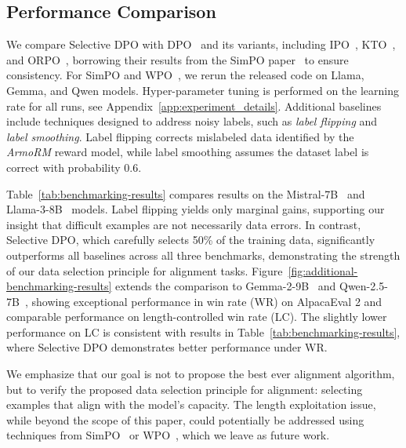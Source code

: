 \subsection{Performance Comparison}

 We compare Selective DPO with DPO~\cite{rafailov2024direct} and its variants, including IPO~\cite{Azar2023AGT}, KTO~\cite{Ethayarajh2024KTOMA}, and ORPO~\cite{Hong2024ORPOMP}, borrowing their results from the SimPO paper~\cite{meng2024simpo} to ensure consistency. For SimPO and WPO~\cite{zhou2024wpo}, we rerun the released code on Llama, Gemma, and Qwen models. Hyper-parameter tuning is performed on the learning rate for all runs, see Appendix~\ref{app:experiment_details}. 
Additional baselines include techniques designed to address noisy labels, such as \textit{label flipping} and \textit{label smoothing}. Label flipping corrects mislabeled data identified by the \textit{ArmoRM} reward model, while label smoothing assumes the dataset label is correct with probability 0.6. 


 Table~\ref{tab:benchmarking-results} compares results on the Mistral-7B~\cite{jiang2023mistral} and Llama-3-8B~\cite{llama3modelcard} models. Label flipping yields only marginal gains, supporting our insight that difficult examples are not necessarily data errors. In contrast, Selective DPO, which carefully selects 50\% of the training data, significantly outperforms all baselines across all three benchmarks, demonstrating the strength of our data selection principle for alignment tasks. 
Figure~\ref{fig:additional-benchmarking-results} extends the comparison to Gemma-2-9B~\cite{team2024gemma} and Qwen-2.5-7B~\cite{qwen2.5}, showing exceptional performance in win rate (WR) on AlpacaEval 2 and comparable performance on length-controlled win rate (LC). The slightly lower performance on LC is consistent with results in Table~\ref{tab:benchmarking-results}, where Selective DPO demonstrates better performance under WR. 

We emphasize that our goal is not to propose the best ever alignment algorithm, but to verify the proposed data selection principle for alignment: selecting examples that align with the model's capacity. The length exploitation issue, while beyond the scope of this paper, could potentially be addressed using techniques from SimPO~\cite{meng2024simpo} or WPO~\cite{zhou2024wpo}, which we leave as future work.

